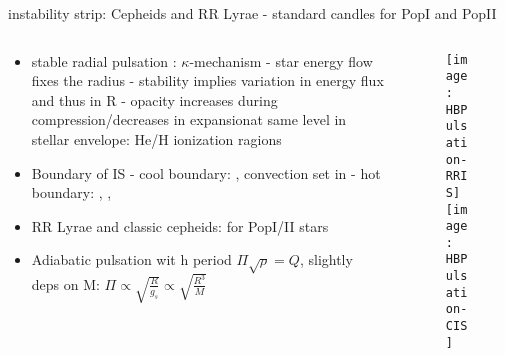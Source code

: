\begin{frame}{instability strip: Cepheids and RR Lyrae - standard candles for PopI and PopII}
\begin{columns}[T]
	\begin{column}{0.45\textwidth}
	\begin{itemize}
	\item stable radial pulsation : $\kappa$-mechanism - star energy flow fixes the radius - stability implies variation in energy flux and thus in R - opacity increases during compression/decreases in expansionat same level in stellar envelope: He/H ionization ragions
        \item Boundary of IS - cool boundary: , convection set in - hot boundary: , , 
	\item RR Lyrae and classic cepheids:  for PopI/II stars
	\item Adiabatic pulsation wit h period $\Pi\sqrt{\rho}=Q$, slightly deps on M: $\Pi\propto	\sqrt{\frac{R}{g_s}}\propto\sqrt{\frac{R^3}{M}}$ 
	\end{itemize}
	\end{column}
	\begin{column}{0.55\textwidth}
	\begin{figure}[!ht] 
	\texttt{[image: HBPulsation-RRIS]}\label{fig:HBPulsation-RRIS}
	\texttt{[image: HBPulsation-CIS]}\label{fig:HBPulsation-CIS}
	\end{figure}
\end{column}\end{columns}
\end{frame}

